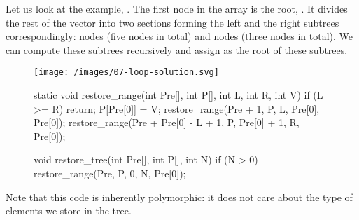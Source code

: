 \documentclass{article}
\begin{document}
Let us look at the example, .
The first node in the array is the root, .
It divides the rest of the vector into two sections forming the left and the right subtrees correspondingly: nodes  (five nodes in total) and nodes  (three nodes in total).
We can compute these subtrees recursively and assign  as the root of these subtrees.

\begin{figure}[grayscale-diagram]
  \texttt{[image: /images/07-loop-solution.svg]}
\end{figure}
\begin{figure}
\begin{code}[c]
static void restore_range(int Pre[], int P[], int L, int R, int V) {
    if (L >= R) return;
    P[Pre[0]] = V;
    restore_range(Pre + 1, P, L, Pre[0], Pre[0]);
    restore_range(Pre + Pre[0] - L + 1, P, Pre[0] + 1, R, Pre[0]);
}

void restore_tree(int Pre[], int P[], int N) {
    if (N > 0) restore_range(Pre, P, 0, N, Pre[0]);
}
\end{code}
\end{figure}

Note that this code is inherently polymorphic: it does not care about the type of elements we store in the tree.
\end{document}

